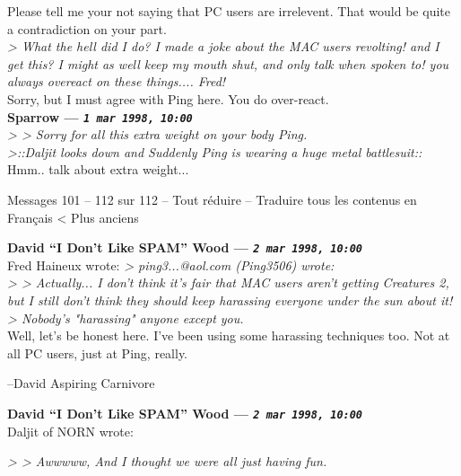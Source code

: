 \documentclass[11pt,twoside,a4paper]{article}
\begin{document}
\begin{multicols*}{2}
Please tell me your not saying that PC users are irrelevent. That would be quite a contradiction on your part.~\\

\emph{> What the hell did I do? I made a joke about the MAC users revolting! and I get this? I might as well keep my mouth shut, and only talk when spoken to! you always overeact on these things.... Fred!}~\\

Sorry, but I must agree with Ping here. You do over-react.~\\

		
	
		
\textbf{Sparrow --- \emph{\texttt{1 mar 1998, 10:00}}}~\\

\emph{> > Sorry for all this extra weight on your body Ping.}~\\

\emph{>::Daljit looks down and Suddenly Ping is wearing a huge metal battlesuit::}~\\

Hmm.. talk about extra weight... 

	
	  	Messages 101 -- 112 sur 112 -- Tout r{\'e}duire  --  Traduire tous les contenus en Fran\c{c}ais 	< Plus anciens 
	
		
\textbf{David ``I Don't Like SPAM'' Wood --- \emph{\texttt{2 mar 1998, 10:00}}}~\\

Fred Haineux wrote:
\emph{> ping3...@aol.com (Ping3506) wrote:}~\\
\emph{> > Actually... I don't think it's fair that MAC users aren't getting Creatures 2, but I still don't think they should keep harassing everyone under the sun about it!}~\\
\emph{> Nobody's "harassing" anyone except you.}~\\

Well, let's be honest here. I've been using some harassing techniques too. Not at all PC users, just at Ping, really.

--David
Aspiring Carnivore

 
		
	
		
\textbf{David ``I Don't Like SPAM'' Wood --- \emph{\texttt{2 mar 1998, 10:00}}}~\\

Daljit of NORN wrote:

\emph{> > Awwwww, And I thought we were all just having fun.}~\\


\end{multicols*}
\end{document}
